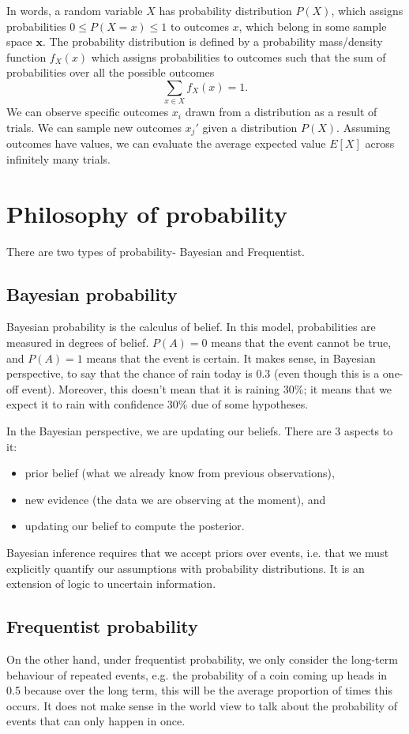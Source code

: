 \documentclass[a4paper, openany]{memoir}
\begin{document}
In words, a random variable $X$ has probability distribution $P(X)$, which assigns probabilities $0 \leq P(X = x) \leq 1$ to outcomes $x$, which belong in some sample space $\mathbf{x}$. The probability distribution is defined by a probability mass/density function $f_X(x)$ which assigns probabilities to outcomes such that the sum of probabilities over all the possible outcomes
\[\sum_{x \in X} f_X(x) = 1.\]
We can observe specific outcomes $x_i$ drawn from a distribution as a result of trials. We can sample new outcomes $x_j'$ given a distribution $P(X)$. Assuming outcomes have values, we can evaluate the average expected value $E[X]$ across infinitely many trials.
\newpage

\section{Philosophy of probability}
There are two types of probability- Bayesian and Frequentist.

\subsection{Bayesian probability}
Bayesian probability is the calculus of belief. In this model, probabilities are measured in degrees of belief. $P(A) = 0$ means that the event cannot be true, and $P(A) = 1$ means that the event is certain. It makes sense, in Bayesian perspective, to say that the chance of rain today is $0.3$ (even though this is a one-off event). Moreover, this doesn't mean that it is raining $30\%$; it means that we expect it to rain with confidence $30\%$ due of some hypotheses.

In the Bayesian perspective, we are updating our beliefs. There are 3 aspects to it:
\begin{itemize}
    \item prior belief (what we already know from previous observations),
    \item new evidence (the data we are observing at the moment), and
    \item updating our belief to compute the posterior.
\end{itemize}
\noindent Bayesian inference requires that we accept priors over events, i.e. that we must explicitly quantify our assumptions with probability distributions. It is an extension of logic to uncertain information.

\subsection{Frequentist probability}
On the other hand, under frequentist probability, we only consider the long-term behaviour of repeated events, e.g. the probability of a coin coming up heads in 0.5 because over the long term, this will be the average proportion of times this occurs. It does not make sense in the world view to talk about the probability of events that can only happen in once.
\end{document}
